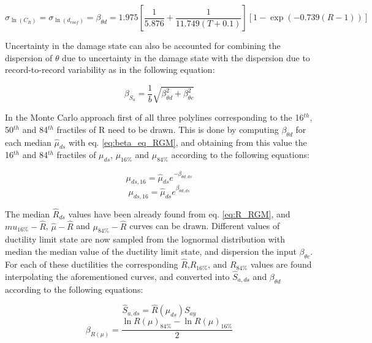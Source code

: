\begin{equation}
\sigma_{\ln(C_R)} = \sigma_{\ln(d_{roof})} = \beta_{\theta d} =  1.975 [\frac{1}{5.876} + \frac{1}{11.749 (T + 0.1)}] [1- \exp(-0.739 (R - 1))]
\label{eq:beta_eq_RGM}
\end{equation}

Uncertainty in the damage state can also be accounted for combining the dispersion of $\theta$ due to uncertainty in the damage state with the dispersion due to record-to-record variability as in the following equation:

\begin{equation}
\beta_{S_a} = \frac{1}{b} \sqrt{\beta_{\theta d}^2 + \beta_{\theta c}^2}
\label{eq:betaStot_RGM}
\end{equation}

In the Monte Carlo approach first of all three polylines corresponding to the 16$^{th}$, 50$^{th}$ and 84$^{th}$ fractiles of R need to be drawn. This is done by computing $\beta_{\theta d}$ for each median $\hat{\mu}_{ds}$ with eq. \ref{eq:beta_eq_RGM}, and obtaining from this value the 16$^{th}$ and 84$^{th}$ fractiles of $\mu_{ds}$, $\mu_{16\%}$ and $\mu_{84\%}$ according to the following equations:

\begin{equation}
\mu_{ds,16} = \hat{\mu}_{ds} e^{-\beta_{\theta d,ds}}
\end{equation}
\begin{equation}
\mu_{ds,16} = \hat{\mu}_{ds} e^{\beta_{\theta d,ds}}
\end{equation}

The median $\hat{R}_{ds}$ values have been already found from eq. \ref{eq:R_RGM}, and $mu_{16\%}-\hat{R}$, $\hat{\mu}-\hat{R}$ and $\mu_{84\%}-\hat{R}$ curves can be drawn.
Different values of ductility limit state are now sampled from the lognormal distribution with median the median value of the ductility limit state, and dispersion the input $\beta_{\theta c}$.
For each of these ductilities the corresponding $\hat{R}$,$R_{16\%}$, and $R_{84\%}$ values are found interpolating the aforementioned curves, and converted into $\hat{S}_{a,ds}$ and $\beta_{\theta d}$ according to the following equations:

\begin{equation}
\hat{S}_{a,ds} = \hat{R}(\mu_{ds}) S_{ay}
\label{eq:SaR}
\end{equation}
\begin{equation}
\beta_{R(\mu)} = \frac{\ln R(\mu)_{84\%} - \ln R(\mu)_{16\%}}{2}
\label{eq:betaR}
\end{equation} 

